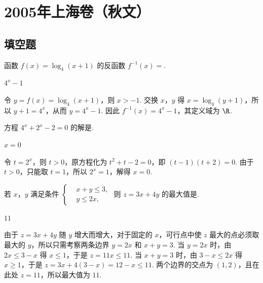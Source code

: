 \chapter{2005年上海卷（秋文）}
\section{填空题}
\begin{problem}
函数 \( f(x)=\log_{4}(x+1) \) 的反函数 \( f^{-1}(x)= \)\fillinblank{}.
\end{problem}

\begin{answer}
\(4^x-1\)
\end{answer}

\begin{solution}
令 \(y=f(x)=\log_{4}(x+1)\)，则 \(x>-1\). 交换 \(x\)，\(y\) 得 \(x=\log_{4}(y+1)\)，所以 \(y+1=4^x\)，从而 \(y=4^x-1\). 因此 \(f^{-1}(x)=4^x-1\)，其定义域为 \(\R\).
\end{solution}

\begin{problem}
方程 \( 4^{x} + 2^{x} - 2 = 0 \) 的解是\fillinblank{}.
\end{problem}

\begin{answer}
\(x=0\)
\end{answer}

\begin{solution}
令 \(t=2^x\)，则 \(t>0\)，原方程化为 \(t^2+t-2=0\)，即 \((t-1)(t+2)=0\). 由于 \(t>0\)，只能取 \(t=1\)，所以 \(2^x=1\)，解得 \(x=0\).
\end{solution}

\begin{problem}
若 \(x\)，\(y\) 满足条件 \(\left\{\begin{aligned} &x + y \leqslant 3, \\ &y \leqslant 2x, \end{aligned}\right.\) 则 \(z = 3x + 4y\) 的最大值是\fillinblank{}.
\end{problem}

\begin{answer}
\(11\)
\end{answer}

\begin{solution}
由于 \(z=3x+4y\) 随 \(y\) 增大而增大，对于固定的 \(x\)，可行点中使 \(z\) 最大的点必须取最大的 \(y\)，所以只需考察两条边界 \(y=2x\) 和 \(x+y=3\). 当 \(y=2x\) 时，由 \(2x\leqslant3-x\) 得 \(x\leqslant1\)，于是 \(z=11x\leqslant11\). 当 \(x+y=3\) 时，由 \(3-x\leqslant2x\) 得 \(x\geqslant1\)，于是 \(z=3x+4(3-x)=12-x\leqslant11\). 两个边界的交点为 \((1,2)\)，且在此处 \(z=11\)，所以最大值为 \(11\).
\end{solution}


